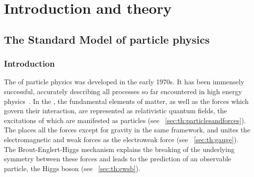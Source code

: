 \chapter{Introduction and theory}
\label{chap:theory}

\section{The Standard Model of particle physics}
\subsection{Introduction}

The \SM of particle physics was developed in the early 1970s. %
It has been immensely successful, accurately describing all processes so far encountered in high energy physics~\cite{PDGBooklet}. 
In the \SM, the fundamental elements of matter, as well as the forces which govern their interaction, are represented as relativistic quantum fields, the excitations of which are manifested as particles (see \Sec~\ref{sec:th:particlesandforces}). The \SM places all the forces except for gravity in the same framework, and unites the electromagnetic and weak forces as the electroweak force (see \Sec~\ref{sec:th:gauge}). The Brout-Englert-Higgs mechanism explains the breaking of the underlying symmetry between these forces and leads to the prediction of an observable particle, the Higgs boson (see \Sec~\ref{sec:th:ewsb}). %




